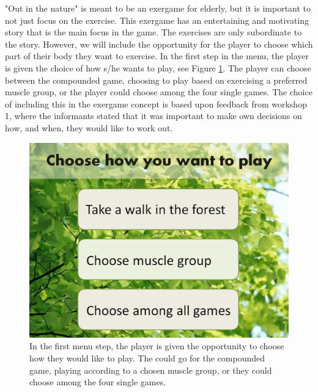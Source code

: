 "Out in the nature" is meant to be an exergame for elderly, but it is important to not just focus on the exercise. This exergame has an entertaining and motivating story that is the main focus in the game. The exercises are only subordinate to the story. However, we will include the opportunity for the player to choose which part of their body they want to exercise. In the first step in the menu, the player is given the choice of how s/he wants to play, see Figure \ref{fig:menuStart}. The player can choose between the compounded game, choosing to play based on exercising a preferred muscle group, or the player could choose among the four single games. The choice of including this in the exergame concept is based upon feedback from workshop 1, where the informants stated that it was important to make own decisions on how, and when, they would like to work out.                     

\begin{figure} [H]
\centering
\includegraphics[scale=0.45]{choosePlay.jpg}
\caption[The menu - start]{In the first menu step, the player is given the opportunity to choose how they would like to play. The could go for the compounded game, playing according to a chosen muscle group, or they could choose among the four single games.}
\label{fig:menuStart}
\end{figure} 

